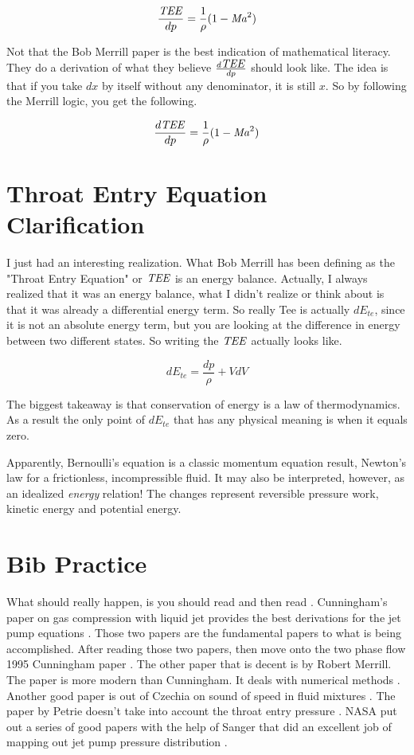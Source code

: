 \documentclass{article}
\newcommand\Mach{\mbox{\textit{Ma}}}  %
\newcommand\Tee{\mbox{\textit{TEE}}}  %
\begin{document}
\begin{equation}
\frac{\Tee}{dp} = \frac{1}{\rho}(1 - \Mach^2)
\end{equation}

Not that the Bob Merrill paper \cite{merrill} is the best indication of mathematical literacy. They do a derivation of what they believe $\frac{d\Tee}{dp}$ should look like. The idea is that if you take $dx$ by itself without any denominator, it is still $x$. So by following the Merrill logic, you get the following.

\begin{equation}
    \frac{d\Tee}{dp} = \frac{1}{\rho}(1 - \Mach^2)
\end{equation}

\section{Throat Entry Equation Clarification}

I just had an interesting realization. What Bob Merrill has been defining as the "Throat Entry Equation" or $\Tee$ is an energy balance. Actually, I always realized that it was an energy balance, what I didn't realize or think about is that it was already a differential energy term. So really Tee is actually $dE_{te}$, since it is not an absolute energy term, but you are looking at the difference in energy between two different states. So writing the $\Tee$ actually looks like.

\begin{equation}
    dE_{te} = \frac{dp}{\rho} + VdV
\end{equation}

The biggest takeaway is that conservation of energy is a law of thermodynamics. As a result the only point of $dE_{te}$ that has any physical meaning is when it equals zero.

Apparently, Bernoulli's equation is a classic momentum equation result, Newton's law for a frictionless, incompressible fluid. It may also be interpreted, however, as an idealized \emph{energy} relation! The changes represent reversible pressure work, kinetic energy and potential energy.

\section{Bib Practice}

What should really happen, is you should read \cite{cunn_gas} and then read \cite{cunn_break}. Cunningham's paper on gas compression with liquid jet provides the best derivations for the jet pump equations \cite{cunn_gas}. Those two papers are the fundamental papers to what is being accomplished. After reading those two papers, then move onto the two phase flow 1995 Cunningham paper \cite{cunn_two}. The other paper that is decent is by Robert Merrill. The paper is more modern than Cunningham. It deals with numerical methods \cite{merrill}. Another good paper is out of Czechia on sound of speed in fluid mixtures \cite{himr}. The paper by Petrie doesn't take into account the throat entry pressure \cite{petrie}. NASA put out a series of good papers with the help of Sanger that did an excellent job of mapping out jet pump pressure distribution \cite{sanger}.

\printbibliography
\end{document}
